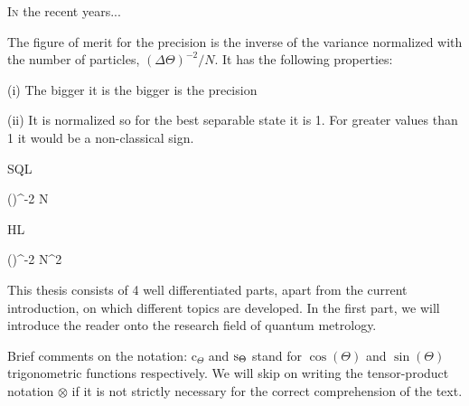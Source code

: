 \lettrine[lines=2, findent=3pt,nindent=0pt]{I}{n} the recent years...

The figure of merit for the precision is the inverse of the variance normalized with the number of particles, $(\Delta \Theta)^{-2}/N$. It has the following properties:

(i) The bigger it is the bigger is the precision

(ii) It is normalized so for the best separable state it is 1.
For greater values than 1 it would be a non-classical sign.

SQL

\be
  (\Delta \Theta)^{-2} \le N
\ee

HL

\be
  (\Delta \Theta)^{-2} \le N^2
\ee

This thesis consists of 4 well differentiated parts, apart from the current introduction, on which different topics are developed.
In the first part, we will introduce the reader onto the research field of quantum metrology.

Brief comments on the notation: $\text{c}_{\Theta}$ and ${\rm s}_{\Theta}$ stand for $\cos(\Theta)$ and $\sin(\Theta)$ trigonometric functions respectively.
We will skip on writing the tensor-product notation $\otimes$ if it is not strictly necessary for the correct comprehension of the text.
